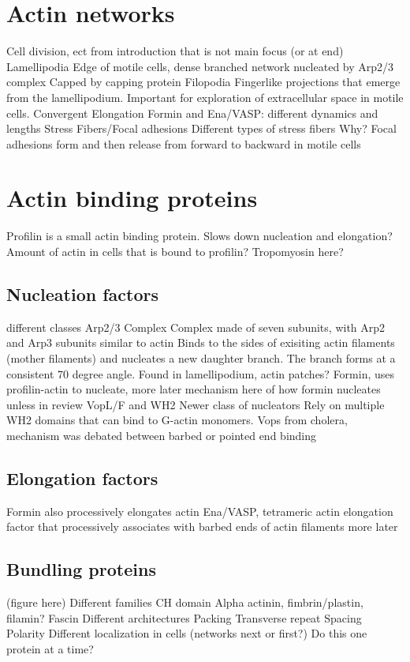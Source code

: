 \section{Actin networks}\label{network-intro}

Cell division, ect from introduction that is not main focus (or at end)
Lamellipodia
Edge of motile cells, dense branched network nucleated by Arp2/3 complex
Capped by capping protein
Filopodia
Fingerlike projections that emerge from the lamellipodium. Important for exploration of extracellular space in motile cells. 
Convergent Elongation
Formin and Ena/VASP: different dynamics and lengths
Stress Fibers/Focal adhesions
Different types of stress fibers
Why?
Focal adhesions form and then release from forward to backward in motile cells

\section{Actin binding proteins}\label{abps} 
Profilin is a small actin binding protein. Slows down nucleation and elongation?
Amount of actin in cells that is bound to profilin?
Tropomyosin here?
\subsection{Nucleation factors}\label{nucleators}
different classes
Arp2/3 Complex
Complex made of seven subunits, with Arp2 and Arp3 subunits similar to actin
Binds to the sides of exisiting actin filaments (mother filaments) and nucleates a new daughter branch. The branch forms at a consistent 70 degree angle.
Found in lamellipodium, actin patches?
Formin, uses profilin-actin to nucleate, more later
   mechanism here of how formin nucleates
   unless in review
VopL/F and WH2
Newer class of nucleators
Rely on multiple WH2 domains that can bind to G-actin monomers. 
Vops from cholera, mechanism was debated between barbed or pointed end binding
\subsection{Elongation factors}\label{elongators}
Formin also processively elongates actin
Ena/VASP, tetrameric actin elongation factor that processively associates with barbed ends of actin filaments more later 
\subsection{Bundling proteins}\label{bundlers}
(figure here)
Different families
CH domain
Alpha actinin, fimbrin/plastin, filamin?
Fascin
Different architectures
Packing
Transverse repeat
Spacing
Polarity
Different localization in cells (networks next or first?)
Do this one protein at a time?

